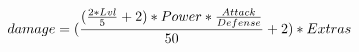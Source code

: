 \documentclass[preview]{standalone}
\begin{document}
\begin{align*}
\special{dvisvgm:raw <g id='unique000'>}damage = (\frac{(\frac{2 * Lvl}{5} + 2) * Power * \frac{Attack}{Defense}}{50} + 2) * Extras\special{dvisvgm:raw </g>}
\end{align*}
\end{document}
